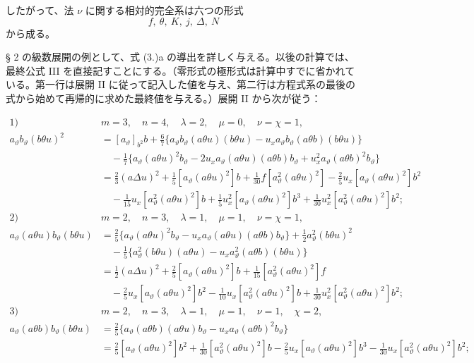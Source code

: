 \documentclass[11pt]{article}
\newcommand{\A}{\Delta}
\begin{document}
したがって、法 $\nu$ に関する相対的完全系は六つの形式
\[
f,\ \theta,\ K,\ j,\ \A,\ N
\]
から成る。

§ 2 の級数展開の例として、式 (3.)a の導出を詳しく与える。以後の計算では、最終公式 III を直接記すことにする。（零形式の極形式は計算中すでに省かれている。第一行は展開 II に従って記入した値を与え、第二行は方程式系の最後の式から始めて再帰的に求めた最終値を与える。）展開 II から次が従う：

\begin{align*}
\text{1)}\quad&m=3,\quad n=4,\quad \lambda=2,\quad \mu=0,\quad \nu=\chi=1,\\
a_\vartheta b_\vartheta(b\theta u)^2
&=[a_\vartheta]_{b^2}b+\frac67\{a_\vartheta b_\vartheta(a\theta u)(b\theta u)-u_xa_\vartheta b_\vartheta(a\theta b)(b\theta u)\}\\
&\quad-\frac17\{a_\vartheta(a\theta u)^2b_\vartheta-2u_xa_\vartheta(a\theta u)(a\theta b)b_\vartheta+u_x^2a_\vartheta(a\theta b)^2b_\vartheta\}\\
&=\frac23(a\Delta u)^2+\frac15[a_\vartheta(a\theta u)^2]b+\frac1{30}f[a_\vartheta^2(a\theta u)^2]-\frac25u_x[a_\vartheta(a\theta u)^2]b^2\\
&\quad-\frac1{15}u_x[a_\vartheta^2(a\theta u)^2]b+\frac15u_x^2[a_\vartheta(a\theta u)^2]b^3+\frac1{30}u_x^2[a_\vartheta^2(a\theta u)^2]b^2;\\[.6em]
\text{2)}\quad&m=2,\quad n=3,\quad \lambda=1,\quad \mu=1,\quad \nu=\chi=1,\\
a_\vartheta(a\theta u)b_\vartheta(b\theta u)
&=\frac25\{a_\vartheta(a\theta u)^2b_\vartheta-u_xa_\vartheta(a\theta u)(a\theta b)b_\vartheta\}+\frac12a_\vartheta^2(b\theta u)^2\\
&\quad-\frac15\{a_\vartheta^2(b\theta u)(a\theta u)-u_xa_\vartheta^2(a\theta b)(b\theta u)\}\\
&=\frac12(a\Delta u)^2+\frac25[a_\vartheta(a\theta u)^2]b+\frac1{15}[a_\vartheta^2(a\theta u)^2]f\\
&\quad-\frac25u_x[a_\vartheta(a\theta u)^2]b^2-\frac1{10}u_x[a_\vartheta^2(a\theta u)^2]b+\frac1{30}u_x^2[a_\vartheta^2(a\theta u)^2]b^2;\\[.6em]
\text{3)}\quad&m=2,\quad n=3,\quad \lambda=1,\quad \mu=1,\quad \nu=1,\quad \chi=2,\\
a_\vartheta(a\theta b)b_\vartheta(b\theta u)
&=\frac25\{a_\vartheta(a\theta b)(a\theta u)b_\vartheta-u_xa_\vartheta(a\theta b)^2b_\vartheta\}\\
&=\frac25[a_\vartheta(a\theta u)^2]b^2+\frac1{30}[a_\vartheta^2(a\theta u)^2]b-\frac25u_x[a_\vartheta(a\theta u)^2]b^3-\frac1{30}u_x[a_\vartheta^2(a\theta u)^2]b^2;\\[.6em]

\end{align*}
\end{document}
